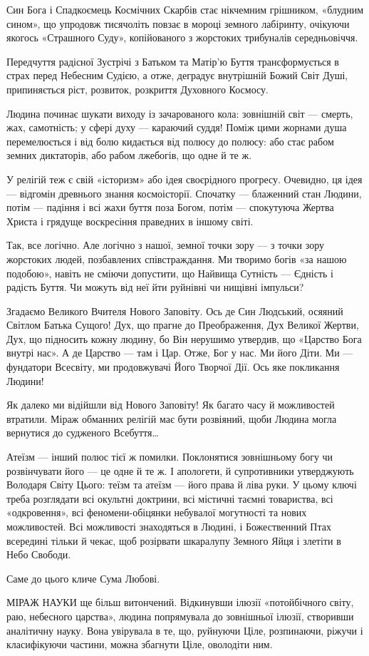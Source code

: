 Син Бога і Спадкоємець Космічних Скарбів стає нікчемним грішником, «блудним
сином», що упродовж тисячоліть повзає в мороці земного лабіринту, очікуючи
якогось «Страшного Суду», копійованого з жорстоких трибуналів середньовіччя.

Передчуття радісної Зустрічі з Батьком та Матір’ю Буття трансформується в страх
перед Небесним Судією, а отже, деградує внутрішній Божий Світ Душі,
припиняється ріст, розвиток, розкриття Духовного Космосу.

Людина починає шукати виходу із зачарованого кола: зовнішній світ — смерть,
жах, самотність; у сфері духу — караючий суддя! Поміж цими жорнами душа
перемелюється і від болю кидається від полюсу до полюсу: або стає рабом земних
диктаторів, або рабом лжебогів, що одне й те ж.

У релігій теж є свій «історизм» або ідея своєрідного прогресу. Очевидно, ця
ідея — відгомін древнього знання космоісторії. Спочатку — блаженний стан
Людини, потім — падіння і всі жахи буття поза Богом, потім — спокутуюча Жертва
Христа і грядуще воскресіння праведних в іншому світі.

Так, все логічно. Але логічно з нашої, земної точки зору — з точки зору
жорстоких людей, позбавлених співстраждання. Ми творимо богів «за нашою
подобою», навіть не сміючи допустити, що Найвища Сутність — Єдність і радість
Буття. Чи можуть від неї йти руйнівні чи нищівні імпульси?

Згадаємо Великого Вчителя Нового Заповіту. Ось де Син Людський, осяяний Світлом
Батька Сущого! Дух, що прагне до Преображення, Дух Великої Жертви, Дух, що
підносить кожну людину, бо Він нерушимо утвердив, що «Царство Бога внутрі нас».
А де Царство — там і Цар. Отже, Бог у нас. Ми його Діти. Ми — фундатори
Всесвіту, ми продовжувачі Його Творчої Дії. Ось яке покликання Людини!

Як далеко ми відійшли від Нового Заповіту! Як багато часу й можливостей
втратили. Міраж обманних релігій має бути розвіяний, щоби Людина могла
вернутися до судженого Всебуття…

Атеїзм — інший полюс тієї ж помилки. Поклонятися зовнішньому богу чи
розвінчувати його — це одне й те ж. І апологети, й супротивники утверджують
Володаря Світу Цього: теїзм та атеїзм — його права й ліва руки. У цьому ключі
треба розглядати всі окультні доктрини, всі містичні таємні товариства, всі
«одкровення», всі феномени-обіцянки небувалої могутності та нових можливостей.
Всі можливості знаходяться в Людині, і Божественний Птах всередині тільки й
чекає, щоб розірвати шкаралупу Земного Яйця і злетіти в Небо Свободи.

Саме до цього кличе Сума Любові.

МІРАЖ НАУКИ ще більш витончений. Відкинувши ілюзії «потойбічного світу, раю,
небесного царства», людина попрямувала до зовнішньої ілюзії, створивши
аналітичну науку. Вона увірувала в те, що, руйнуючи Ціле, розпинаючи, ріжучи і
класифікуючи частини, можна збагнути Ціле, оволодіти ним.

